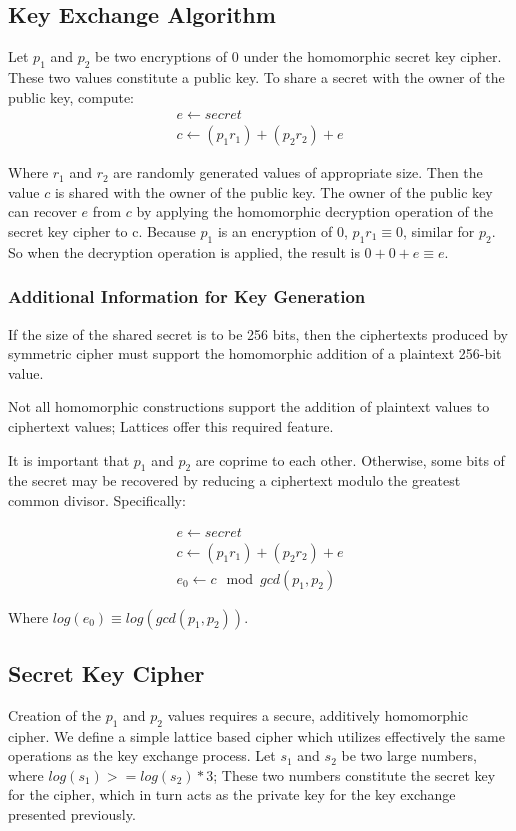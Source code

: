 \documentclass[preprint]{iacrtrans}
\begin{document}
\subsection{Key Exchange Algorithm}
Let $p_1$ and $p_2$ be two encryptions of $0$ under the homomorphic secret key cipher. These two values constitute a public key. To share a secret with the owner of the public key, compute:
\begin{align}
    e \gets secret \\
    c \gets (p_1  r_1) + (p_2 r_2) + e
\end{align}

Where $r_1$ and $r_2$ are randomly generated values of appropriate size. Then the value $c$ is shared with the owner of the public key. The owner of the public key can recover $e$ from $c$ by applying the homomorphic decryption operation of the secret key cipher to c. Because $p_1$ is an encryption of $0$, $p_1 r_1 \equiv 0$, similar for $p_2$. So when the decryption operation is applied, the result is $0 + 0 + e \equiv e$.

\subsubsection{Additional Information for Key Generation}
If the size of the shared secret is to be 256 bits, then the ciphertexts produced by symmetric cipher must support the homomorphic addition of a plaintext 256-bit value. 

Not all homomorphic constructions support the addition of plaintext values to ciphertext values; Lattices offer this required feature.

It is important that $p_1$ and $p_2$ are coprime to each other. Otherwise, some bits of the secret may be recovered by reducing a ciphertext modulo the greatest common divisor. Specifically:

\begin{align}
    e \gets secret\\
    c \gets (p_1 r_1) + (p_2 r_2) + e\\
    e_0 \gets c \mod gcd(p_1, p_2)
\end{align}

Where $log(e_0) \equiv log(gcd(p_1, p_2))$.

\subsection{Secret Key Cipher}
Creation of the $p_1$ and $p_2$ values requires a secure, additively homomorphic cipher. We define a simple lattice based cipher which utilizes effectively the same operations as the key exchange process. Let $s_1$ and $s_2$ be two large numbers, where $log(s_1) >= log(s_2) * 3$; These two numbers constitute the secret key for the cipher, which in turn acts as the private key for the key exchange presented previously.\\
\end{document}
